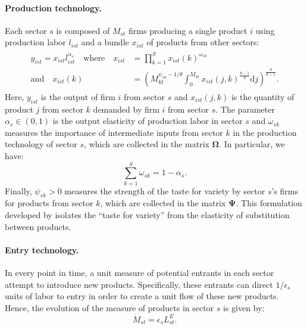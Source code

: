 \documentclass[12pt]{article}
\begin{document}
\paragraph{Production technology.} Each sector $s$ is composed of $M_{st}$ firms producing a single product $i$ using production labor $l_{ist}$ and a bundle $x_{ist}$ of products from other sectors:
\begin{align}
    \begin{split}
    y_{ist} = x_{ist} l_{ist}^{\alpha_s} \quad \text{where} \quad x_{ist} &= \prod_{k = 1}^S x_{ist}(k)^{\omega_{sk}} \\
    \text{and} \quad x_{ist}(k) &= \left(M_{kt}^{\psi_{sk} - 1 / \theta} \int_0^{M_{kt}} x_{ist}(j, k)^{\frac{\theta - 1}{\theta}} \mathrm{d}j\right)^{\frac{\theta}{\theta - 1}}. \label{eq:production technology}
    \end{split}
\end{align}
Here, $y_{ist}$ is the output of firm $i$ from sector $s$ and $x_{ist}(j, k)$ is the quantity of product $j$ from sector $k$ demanded by firm $i$ from sector $s$. The parameter $\alpha_s \in (0, 1)$ is the output elasticity of production labor in sector $s$ and $\omega_{sk}$ measures the importance of intermediate inputs from sector $k$ in the production technology of sector $s$, which are collected in the matrix $\bm{\Omega}$. In particular, we have:
\begin{equation*}
    \sum_{k = 1}^S \omega_{sk} = 1 - \alpha_s.
\end{equation*}
Finally, $\psi_{sk} > 0$ measures the strength of the taste for variety by sector $s$'s firms for products from sector $k$, which are collected in the matrix $\bm{\Psi}$. This formulation developed by \citet{Benassy_1996} isolates the ``taste for variety'' from the elasticity of substitution between products.

\paragraph{Entry technology.} In every point in time, a unit measure of potential entrants in each sector attempt to introduce new products. Specifically, these entrants can direct $1 / \epsilon_s$ units of labor to entry in order to create a unit flow of these new products. Hence, the evolution of the measure of products in sector $s$ is given by:
\begin{equation}
    \dot{M}_{st} = \epsilon_s L_{st}^E. \label{eq:entry technology}
\end{equation}
\end{document}
